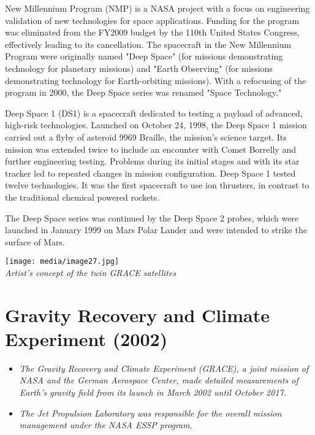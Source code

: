 New Millennium Program (NMP) is a NASA project with a focus on
engineering validation of new technologies for space applications.
Funding for the program was eliminated from the FY2009 budget by the
110th United States Congress, effectively leading to its cancellation.
The spacecraft in the New Millennium Program were originally named "Deep
Space" (for missions demonstrating technology for planetary missions)
and "Earth Observing" (for missions demonstrating technology for
Earth-orbiting missions). With a refocusing of the program in 2000, the
Deep Space series was renamed "Space Technology."

Deep Space 1 (DS1) is a spacecraft dedicated to testing a payload of
advanced, high-risk technologies. Launched on October 24, 1998, the Deep
Space 1 mission carried out a flyby of asteroid 9969 Braille, the
mission's science target. Its mission was extended twice to include an
encounter with Comet Borrelly and further engineering testing. Problems
during its initial stages and with its star tracker led to repeated
changes in mission configuration. Deep Space 1 tested twelve
technologies. It was the first spacecraft to use ion thrusters, in
contrast to the traditional chemical powered rockets.

The Deep Space series was continued by the Deep Space 2 probes, which
were launched in January 1999 on Mars Polar Lander and were intended to
strike the surface of Mars.

\texttt{[image: media/image27.jpg]}\\
\emph{Artist's concept of the twin GRACE satellites}

\section{Gravity Recovery and Climate Experiment
(2002)}\label{gravity-recovery-and-climate-experiment-2002}

\begin{itemize}
\item
  \emph{The Gravity Recovery and Climate Experiment (GRACE), a joint
  mission of NASA and the German Aerospace Center, made detailed
  measurements of Earth's gravity field from its launch in March 2002
  until October 2017.}
\item
  \emph{The Jet Propulsion Laboratory was responsible for the overall
  mission management under the NASA ESSP program.}
\end{itemize}

